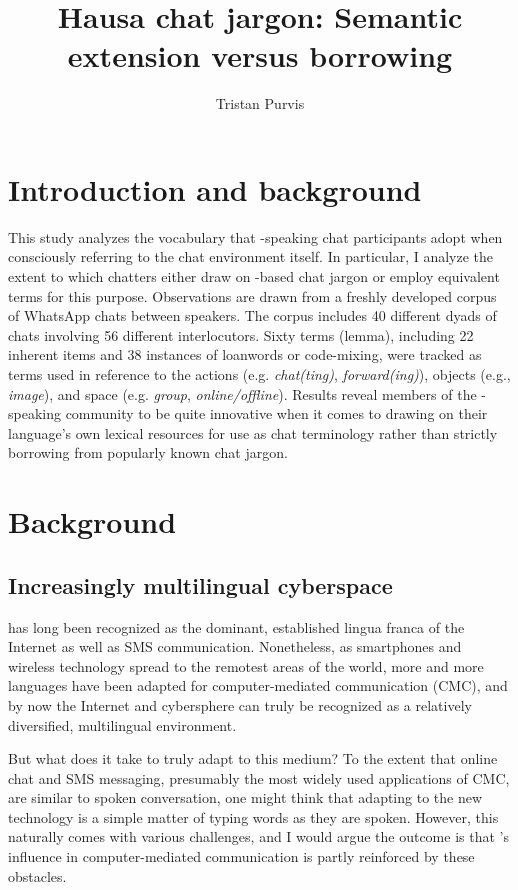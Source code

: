 \documentclass[output=paper
,newtxmath
,modfonts
,nonflat]{langsci/langscibook}
\title{Hausa chat jargon: Semantic extension versus borrowing}
\author{Tristan Purvis\affiliation{American University of Nigeria}}
\begin{document}
\maketitle

\section{Introduction and background}

This study analyzes the vocabulary that -speaking chat participants adopt when consciously referring to the chat environment itself. In particular, I analyze the extent to which chatters either draw on -based chat jargon or employ equivalent  terms for this purpose. Observations are drawn from a freshly developed corpus of WhatsApp chats between  speakers. The corpus includes 40 different dyads of chats involving 56 different interlocutors. Sixty terms (lemma), including 22 inherent  items and 38 instances of  loanwords or code-mixing, were tracked as terms used in reference to the actions (e.g. \textit{chat(ting)}, \textit{forward(ing)}), objects (e.g., \textit{image}), and space (e.g. \textit{group}, \textit{online/offline}). Results reveal members of the -speaking community to be quite innovative when it comes to drawing on their language’s own lexical resources for use as chat terminology rather than strictly borrowing from popularly known  chat jargon.

\section{Background}
\subsection{Increasingly multilingual cyberspace}

 has long been recognized as the dominant, established lingua franca of the Internet \citep{danet2007} as well as SMS communication. Nonetheless, as smartphones and wireless technology spread to the remotest areas of the world, more and more languages have been adapted for computer-mediated communication (CMC), and by now the Internet and cybersphere can truly be recognized as a relatively diversified, multilingual environment. 

But what does it take to truly adapt to this medium? To the extent that online chat and SMS messaging, presumably the most widely used applications of CMC, are similar to spoken conversation, one might think that adapting to the new technology is a simple matter of typing words as they are spoken. However, this naturally comes with various challenges, and I would argue the outcome is that ’s influence in computer-mediated communication is partly reinforced by these obstacles. 
\end{document}

